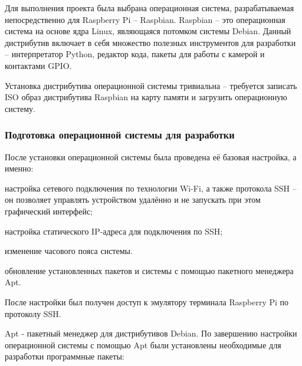 Для выполнения проекта была выбрана операционная система, разрабатываемая непосредственно для Raspberry Pi -- Raspbian. Raspbian -- это операционная система на основе ядра Linux, являющаяся потомком системы Debian. Данный дистрибутив включает в себя множество полезных инструментов для разработки -- интерпретатор Python, редактор кода, пакеты для работы с камерой и контактами GPIO. 

Установка дистрибутива операционной системы тривиальна -- требуется записать ISO образ дистрибутива Raspbian на карту памяти и загрузить операционную систему.

\subsubsection{Подготовка операционной системы для разработки}
После установки операционной системы была проведена её базовая настройка, а именно:
\begin{itemize*}
\item настройка сетевого подключения по технологии Wi-Fi, а также протокола SSH -- он позволяет управлять устройством удалённо и не запускать при этом графический интерфейс; 
\item настройка статического IP-адреса для подключения по SSH; 
\item изменение часового пояса системы.
\item обновление установленных пакетов и системы с помощью пакетного менеджера Apt.
\end{itemize*}

После настройки был получен доступ к эмулятору терминала Raspberry Pi по протоколу SSH.


Apt - пакетный менеджер для дистрибутивов Debian. По завершению настройки операционной системы с помощью Apt были установлены необходимые для разработки программные пакеты:
\begin{itemize*}
\item 
\end{itemize*}
